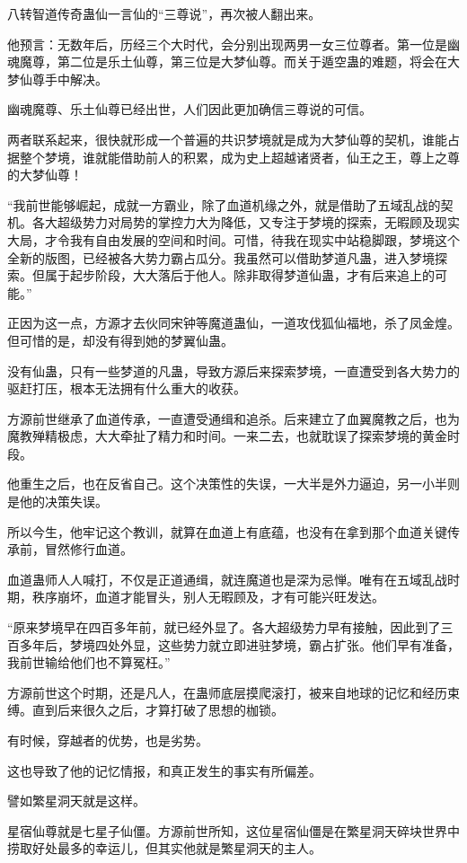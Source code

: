 \begin{this_body}
八转智道传奇蛊仙一言仙的“三尊说”，再次被人翻出来。

他预言：无数年后，历经三个大时代，会分别出现两男一女三位尊者。第一位是幽魂魔尊，第二位是乐土仙尊，第三位是大梦仙尊。而关于遁空蛊的难题，将会在大梦仙尊手中解决。

幽魂魔尊、乐土仙尊已经出世，人们因此更加确信三尊说的可信。

两者联系起来，很快就形成一个普遍的共识梦境就是成为大梦仙尊的契机，谁能占据整个梦境，谁就能借助前人的积累，成为史上超越诸贤者，仙王之王，尊上之尊的大梦仙尊！

“我前世能够崛起，成就一方霸业，除了血道机缘之外，就是借助了五域乱战的契机。各大超级势力对局势的掌控力大为降低，又专注于梦境的探索，无暇顾及现实大局，才令我有自由发展的空间和时间。可惜，待我在现实中站稳脚跟，梦境这个全新的版图，已经被各大势力霸占瓜分。我虽然可以借助梦道凡蛊，进入梦境探索。但属于起步阶段，大大落后于他人。除非取得梦道仙蛊，才有后来追上的可能。”

正因为这一点，方源才去伙同宋钟等魔道蛊仙，一道攻伐狐仙福地，杀了凤金煌。但可惜的是，却没有得到她的梦翼仙蛊。

没有仙蛊，只有一些梦道的凡蛊，导致方源后来探索梦境，一直遭受到各大势力的驱赶打压，根本无法拥有什么重大的收获。

方源前世继承了血道传承，一直遭受通缉和追杀。后来建立了血翼魔教之后，也为魔教殚精极虑，大大牵扯了精力和时间。一来二去，也就耽误了探索梦境的黄金时段。

他重生之后，也在反省自己。这个决策性的失误，一大半是外力逼迫，另一小半则是他的决策失误。

所以今生，他牢记这个教训，就算在血道上有底蕴，也没有在拿到那个血道关键传承前，冒然修行血道。

血道蛊师人人喊打，不仅是正道通缉，就连魔道也是深为忌惮。唯有在五域乱战时期，秩序崩坏，血道才能冒头，别人无暇顾及，才有可能兴旺发达。

“原来梦境早在四百多年前，就已经外显了。各大超级势力早有接触，因此到了三百多年后，梦境四处外显，这些势力就立即进驻梦境，霸占扩张。他们早有准备，我前世输给他们也不算冤枉。”

方源前世这个时期，还是凡人，在蛊师底层摸爬滚打，被来自地球的记忆和经历束缚。直到后来很久之后，才算打破了思想的枷锁。

有时候，穿越者的优势，也是劣势。

这也导致了他的记忆情报，和真正发生的事实有所偏差。

譬如繁星洞天就是这样。

星宿仙尊就是七星子仙僵。方源前世所知，这位星宿仙僵是在繁星洞天碎块世界中捞取好处最多的幸运儿，但其实他就是繁星洞天的主人。


\end{this_body}
